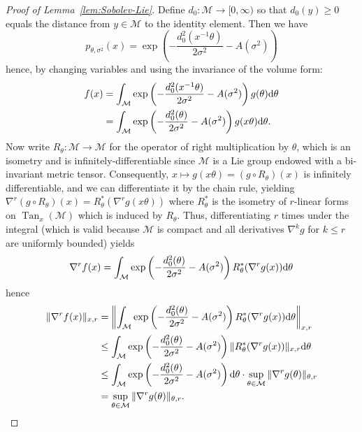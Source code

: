 \documentclass[preprint]{imsart}
\theoremstyle{plain}
\theoremstyle{definition}
\newcommand{\Mcal}{\mathcal{M}}
\newcommand{\diff}{\textnormal{d}}
\DeclareMathOperator{\Tan}{Tan}
\begin{document}
\begin{appendix}
\begin{proof}[Proof of Lemma~\ref{lem:Sobolev-Lie}]
    Define $d_0:\Mcal\to[0,\infty)$ so that $d_0(y)\ge 0$ equals the distance from $y\in\Mcal$ to the identity element.
    Then we have
    \begin{equation*}
        p_{\theta,\sigma^2}(x)=\exp\left(-\frac{d_0^2(x^{-1}\theta)}{2\sigma^2}-A(\sigma^2)\right)
    \end{equation*}
    hence, by changing variables and using the invariance of the volume form:
    \begin{align*}
        f(x) &= \int_{\Mcal}\exp\left(-\frac{d_0^2(x^{-1}\theta)}{2\sigma^2}-A(\sigma^2)\right)g(\theta)\diff\theta \\
        &= \int_{\Mcal}\exp\left(-\frac{d_0^2(\theta)}{2\sigma^2}-A(\sigma^2)\right)g(x\theta)\diff\theta.
    \end{align*}
    Now write $R_{\theta}:\Mcal\to\Mcal$ for the operator of right multiplication by $\theta$, which is an isometry and is infinitely-differentiable since $\Mcal$ is a Lie group endowed with a bi-invariant metric tensor.
    Consequently, $x\mapsto g(x\theta) = (g\circ R_{\theta})(x)$ is infinitely differentiable, and we can differentiate it by the chain rule, yielding $\nabla^r(g\circ R_{\theta})(x) = R_{\theta}^{\ast}(\nabla^rg(x\theta))$ where $R_{\theta}^{\ast}$ is the isometry of $r$-linear forms on $\Tan_x(\Mcal)$ which is induced by $R_{\theta}$.
    Thus, differentiating $r$ times under the integral (which is valid because $\Mcal$ is compact and all derivatives $\nabla^kg$ for $k\le r$ are uniformly bounded) yields   
    \begin{equation*}
        \nabla^rf(x) =\int_{\Mcal}\exp\left(-\frac{d_0^2(\theta)}{2\sigma^2}-A(\sigma^2)\right)R_{\theta}^{\ast}(\nabla^rg(x))\diff\theta
    \end{equation*}
    hence
    \begin{align*}
        \|\nabla^rf(x)\|_{x,r} &=\left\|\int_{\Mcal}\exp\left(-\frac{d_0^2(\theta)}{2\sigma^2}-A(\sigma^2)\right)R_{\theta}^{\ast}(\nabla^r g(x))\diff\theta\right\|_{x,r} \\
        &\le\int_{\Mcal}\exp\left(-\frac{d_0^2(\theta)}{2\sigma^2}-A(\sigma^2)\right)\|R_{\theta}^{\ast}(\nabla^rg(x))\|_{x,r}\diff\theta \\
        &\le\int_{\Mcal}\exp\left(-\frac{d_0^2(\theta)}{2\sigma^2}-A(\sigma^2)\right)\diff\theta\cdot \sup_{\theta\in\Mcal}\|\nabla^rg(\theta)\|_{\theta,r} \\
        &=\sup_{\theta\in\Mcal}\|\nabla^rg(\theta)\|_{\theta,r}.

\end{align*}
\end{proof}
\end{appendix}
\end{document}
